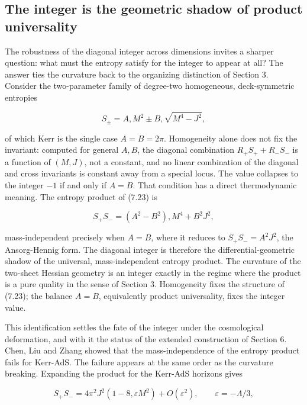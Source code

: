 \documentclass[11pt]{article}
\begin{document}
\subsection{The integer is the geometric shadow of product universality}

The robustness of the diagonal integer across dimensions invites a sharper question: what must the entropy satisfy for the integer to appear at all? The answer ties the curvature back to the organizing distinction of Section 3. Consider the two-parameter family of degree-two homogeneous, deck-symmetric entropies

\begin{equation*}
S_\pm = A,M^2 \pm B,\sqrt{M^4 - J^2},
\tag{7.23}
\end{equation*}

of which Kerr is the single case $A = B = 2\pi$. Homogeneity alone does not fix the invariant: computed for general $A, B$, the diagonal combination $R_+S_+ + R_-S_-$ is a function of $(M,J)$, not a constant, and no linear combination of the diagonal and cross invariants is constant away from a special locus. The value collapses to the integer $-1$ if and only if $A = B$. That condition has a direct thermodynamic meaning. The entropy product of (7.23) is

\begin{equation*}
S_+ S_- = (A^2 - B^2),M^4 + B^2 J^2,
\tag{7.24}
\end{equation*}

mass-independent precisely when $A = B$, where it reduces to $S_+ S_- = A^2 J^2$, the Ansorg-Hennig form. The diagonal integer is therefore the differential-geometric shadow of the universal, mass-independent entropy product. The curvature of the two-sheet Hessian geometry is an integer exactly in the regime where the product is a pure quality in the sense of Section 3. Homogeneity fixes the structure of (7.23); the balance $A = B$, equivalently product universality, fixes the integer value.

This identification settles the fate of the integer under the cosmological deformation, and with it the status of the extended construction of Section 6. Chen, Liu and Zhang showed that the mass-independence of the entropy product fails for Kerr-AdS. The failure appears at the same order as the curvature breaking. Expanding the product for the Kerr-AdS horizons gives

\begin{equation*}
S_+ S_- = 4\pi^2 J^2\left(1 - 8,\varepsilon M^2\right) + O(\varepsilon^2), \qquad \varepsilon = -\Lambda/3,
\tag{7.25}
\end{equation*}
\end{document}
